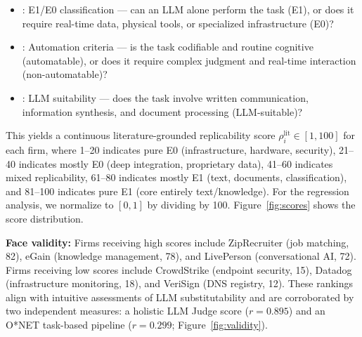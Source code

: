 \documentclass[12pt,a4paper]{article}
\begin{document}
\begin{itemize}
\item \citet{eloundou2024}: E1/E0 classification --- can an LLM alone perform the task (E1), or does it require real-time data, physical tools, or specialized infrastructure (E0)?
\item \citet{acemoglu2022}: Automation criteria --- is the task codifiable and routine cognitive (automatable), or does it require complex judgment and real-time interaction (non-automatable)?
\item \citet{brynjolfsson2023}: LLM suitability --- does the task involve written communication, information synthesis, and document processing (LLM-suitable)?
\end{itemize}

This yields a continuous literature-grounded replicability score $\rho_i^{\text{lit}} \in [1, 100]$ for each firm, where 1--20 indicates pure E0 (infrastructure, hardware, security), 21--40 indicates mostly E0 (deep integration, proprietary data), 41--60 indicates mixed replicability, 61--80 indicates mostly E1 (text, documents, classification), and 81--100 indicates pure E1 (core entirely text/knowledge). For the regression analysis, we normalize to $[0,1]$ by dividing by 100. Figure~\ref{fig:scores} shows the score distribution.

\textbf{Face validity:} Firms receiving high scores include ZipRecruiter (job matching, 82), eGain (knowledge management, 78), and LivePerson (conversational AI, 72). Firms receiving low scores include CrowdStrike (endpoint security, 15), Datadog (infrastructure monitoring, 18), and VeriSign (DNS registry, 12). These rankings align with intuitive assessments of LLM substitutability and are corroborated by two independent measures: a holistic LLM Judge score ($r = 0.895$) and an O*NET task-based pipeline ($r = 0.299$; Figure~\ref{fig:validity}).
\end{document}
